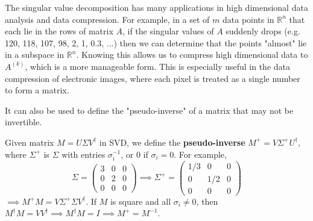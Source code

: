   The singular value decomposition has many applications in high dimensional data analysis and data compression. For example, in a set of $m$ data points in $\mathbb{R}^n$ that each lie in the rows of matrix $A$, if the singular values of $A$ suddenly drops (e.g. 120, 118, 107, 98, 2, 1, 0.3, ...) then we can determine that the points "almost" lie in a subspace in $\mathbb{R}^n$. Knowing this allows us to compress high dimensional data to $A^{(k)}$, which is a more manageable form. This is especially useful in the data compression of electronic images, where each pixel is treated as a single number to form a matrix. 

  It can also be used to define the "pseudo-inverse" of a matrix that may not be invertible. 

  \begin{definition}
    Given matrix $M = U \Sigma V^\dagger$ in SVD, we define the \textbf{pseudo-inverse} $M^+ = V \Sigma^+ U^\dagger$, where $\Sigma^+$ is $\Sigma$ with entries $\sigma_i^{-1}$, or $0$ if $\sigma_i = 0$. For example,
    \begin{equation}
      \Sigma = \begin{pmatrix}3&0&0\\0&2&0\\0&0&0\end{pmatrix} \implies \Sigma^+ = \begin{pmatrix}1/3&0&0\\0&1/2&0\\0&0&0\end{pmatrix}
    \end{equation}
    $\implies M^+ M = V \Sigma^+ \Sigma V^\dagger$. If $M$ is square and all $\sigma_i \neq 0$, then $M^\dagger M = V V^\dagger \implies M^\dagger M = I \implies  M^+ = M^{-1}$. 
  \end{definition}

